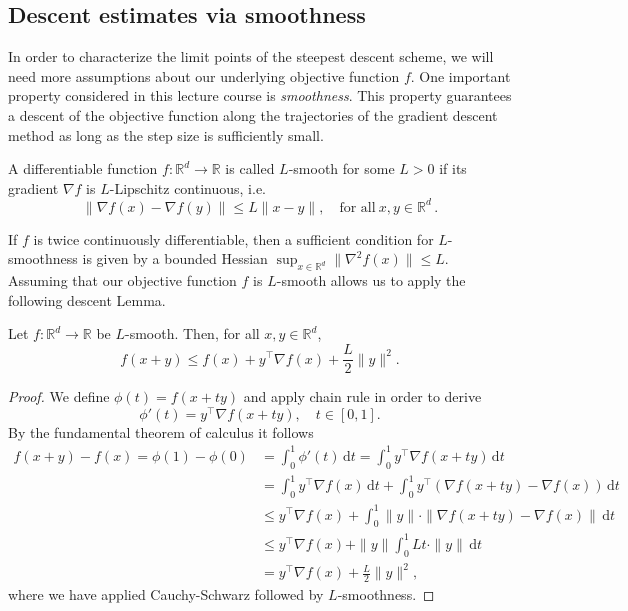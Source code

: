 \documentclass[12pt,openany]{book}
\theoremstyle{definition}
\theoremstyle{definition}
\newcommand{\R}{\mathbb{R}}
\begin{document}
\subsection{Descent estimates via smoothness}
In order to characterize the limit points of the steepest descent scheme, we will need more assumptions about our underlying objective function $f$. One important property considered in this lecture course is \textit{smoothness}. This property guarantees a descent of the objective function along the trajectories of the gradient descent method as long as the step size is sufficiently small.

\begin{defi}
A differentiable function $f:\R^d\to\R$ is called $L$-smooth for some $L>0$ if its gradient $\nabla f$ is $L$-Lipschitz continuous, i.e.
\[
\|\nabla f(x)-\nabla f(y)\|\leq L\|x-y\|,
\quad \text{for all}\ x,y\in\R^d\,.
\]
\end{defi}

If $f$ is twice continuously differentiable, then a sufficient condition for $L$-smoothness is given by a bounded Hessian $\sup_{x\in\R^d}\|\nabla^2 f(x)\|\le L$. Assuming that our objective function $f$ is $L$-smooth allows us to apply the following descent Lemma.
\begin{lemma}\label{lem:descentlemma}
Let $f:\R^d\to\R$ be $L$-smooth. Then, for all $x,y\in\R^d$,
\[f(x+y) \le f(x) + y^\top \nabla f(x) + \frac{L}{2}\|y\|^2. \]
\end{lemma}


\begin{proof}
We define $\phi(t) = f(x+ty)$ and apply chain rule in order to derive
\[\phi'(t) = y^\top \nabla f(x+ty),\quad t\in[0,1]. \]
By the fundamental theorem of calculus it follows
\begin{align*}
f(x+y) - f(x) = \phi(1)- \phi(0) &= \int_0^1 \phi'(t)\, {\mathrm d}t = \int_0^1 y^\top \nabla f(x+ty)\,{\mathrm d}t\\
&=\int_0^1 y^\top \nabla f(x)\,{\mathrm d}t + \int_0^1y^\top (\nabla f(x+ty)-\nabla f(x))\,{\mathrm d}t\\
&\le y^\top \nabla f(x) + \int_0^1\|y\|\cdot \|\nabla f(x+ty)-\nabla f(x)\|\,{\mathrm d}t\\
&\le y^\top \nabla f(x) + \|y\|\int_0^1 Lt\cdot \|y\|\,{\mathrm d}t\\
&= y^\top \nabla f(x) + \frac{L}{2}\|y\|^2,
\end{align*}
where we have applied Cauchy-Schwarz followed by $L$-smoothness. 
\end{proof}
\end{document}
